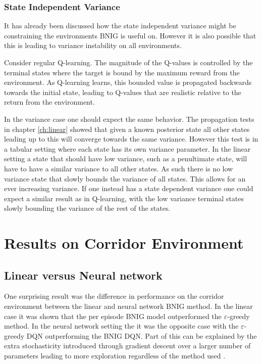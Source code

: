 \subsubsection{State Independent Variance}

It has already been discussed how the state independent variance might be constraining the environments BNIG is useful on. However it is also possible that this is leading to variance instability on all environments. 

Consider regular Q-learning. The magnitude of the Q-values is controlled by the terminal states where the target is bound by the maximum reward from the environment. As Q-learning learns, this bounded value is propagated backwards towards the initial state, leading to Q-values that are realistic relative to the return from the environment.

In the variance case one should expect the same behavior. The propagation tests in chapter \ref{ch:linear} showed that given a known posterior state all other states leading up to this will converge towards the same variance. However this test is in a tabular setting where each state has its own variance parameter. In the linear setting a state that should have low variance, such as a penultimate state, will have to have a similar variance to all other states. As such there is no low variance state that slowly bounds the variance of all states. This allows for an ever increasing variance. If one instead has a state dependent variance one could expect a similar result as in Q-learning, with the low variance terminal states slowly bounding the variance of the rest of the states.

\section{Results on Corridor Environment}

\subsection{Linear versus Neural network}

One surprising result was the difference in performance on the corridor environment between the linear and neural network BNIG method. In the linear case it was shown that the per episode BNIG model outperformed the $\varepsilon$-greedy method. In the neural network setting the it was the opposite case with the $\varepsilon$-greedy DQN outperforming the BNIG DQN. Part of this can be explained by the extra stochasticity introduced through gradient descent over a larger number of parameters leading to more exploration regardless of the method used \citep{carlos_2018}. 

